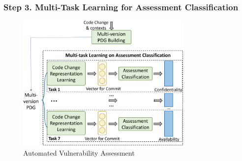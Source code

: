 


\vspace{2pt}
\subsubsection*{{\bf Step 3. Multi-Task Learning for Assessment Classification}}

\begin{figure}
	\centering
	\includegraphics[width=3.4in]{overview-cat.png}
	\caption{Automated Vulnerability Assessment}
	\label{cat-overview}
\end{figure}

